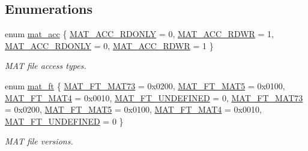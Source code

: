 \subsection*{Enumerations}
\begin{DoxyCompactItemize}
\item 
enum \hyperlink{group___m_a_t_gaa9dcbc70f538af79bd557593ff6b5cdb}{mat\+\_\+acc} \{ \hyperlink{group___m_a_t_ggaa9dcbc70f538af79bd557593ff6b5cdba8dd1457651b27ba9bea6cfba158c037c}{M\+A\+T\+\_\+\+A\+C\+C\+\_\+\+R\+D\+O\+N\+LY} = 0, 
\hyperlink{group___m_a_t_ggaa9dcbc70f538af79bd557593ff6b5cdba0f65f27ea42fde32d62b702b82329c1f}{M\+A\+T\+\_\+\+A\+C\+C\+\_\+\+R\+D\+WR} = 1, 
\hyperlink{group___m_a_t_ggaa9dcbc70f538af79bd557593ff6b5cdba8dd1457651b27ba9bea6cfba158c037c}{M\+A\+T\+\_\+\+A\+C\+C\+\_\+\+R\+D\+O\+N\+LY} = 0, 
\hyperlink{group___m_a_t_ggaa9dcbc70f538af79bd557593ff6b5cdba0f65f27ea42fde32d62b702b82329c1f}{M\+A\+T\+\_\+\+A\+C\+C\+\_\+\+R\+D\+WR} = 1
 \}\begin{DoxyCompactList}\small\item\em M\+AT file access types. \end{DoxyCompactList}
\item 
enum \hyperlink{group___m_a_t_gad03442b8378999189d510e3745c702b7}{mat\+\_\+ft} \{ \newline
\hyperlink{group___m_a_t_ggad03442b8378999189d510e3745c702b7a765c5d1d5038947646260dc82483517e}{M\+A\+T\+\_\+\+F\+T\+\_\+\+M\+A\+T73} = 0x0200, 
\hyperlink{group___m_a_t_ggad03442b8378999189d510e3745c702b7a31ade1f6989411dc0299007e2c7d33b2}{M\+A\+T\+\_\+\+F\+T\+\_\+\+M\+A\+T5} = 0x0100, 
\hyperlink{group___m_a_t_ggad03442b8378999189d510e3745c702b7a858b4f5da65548219b1c3ad47aa478d3}{M\+A\+T\+\_\+\+F\+T\+\_\+\+M\+A\+T4} = 0x0010, 
\hyperlink{group___m_a_t_ggad03442b8378999189d510e3745c702b7a29ebbcb4c6854eb5524a94d0f153a547}{M\+A\+T\+\_\+\+F\+T\+\_\+\+U\+N\+D\+E\+F\+I\+N\+ED} = 0, 
\newline
\hyperlink{group___m_a_t_ggad03442b8378999189d510e3745c702b7a765c5d1d5038947646260dc82483517e}{M\+A\+T\+\_\+\+F\+T\+\_\+\+M\+A\+T73} = 0x0200, 
\hyperlink{group___m_a_t_ggad03442b8378999189d510e3745c702b7a31ade1f6989411dc0299007e2c7d33b2}{M\+A\+T\+\_\+\+F\+T\+\_\+\+M\+A\+T5} = 0x0100, 
\hyperlink{group___m_a_t_ggad03442b8378999189d510e3745c702b7a858b4f5da65548219b1c3ad47aa478d3}{M\+A\+T\+\_\+\+F\+T\+\_\+\+M\+A\+T4} = 0x0010, 
\hyperlink{group___m_a_t_ggad03442b8378999189d510e3745c702b7a29ebbcb4c6854eb5524a94d0f153a547}{M\+A\+T\+\_\+\+F\+T\+\_\+\+U\+N\+D\+E\+F\+I\+N\+ED} = 0
 \}\begin{DoxyCompactList}\small\item\em M\+AT file versions. \end{DoxyCompactList}

\end{DoxyCompactItemize}
